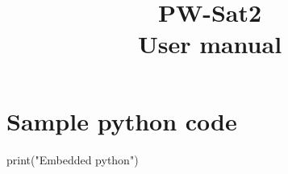 \documentclass[]{article}
\title{PW-Sat2\\User manual}
\author{}
\begin{document}
\maketitle

\begin{abstract}

\end{abstract}

\section{Sample python code}

\begin{pycode}
print("Embedded python")
\end{pycode}
\end{document}
